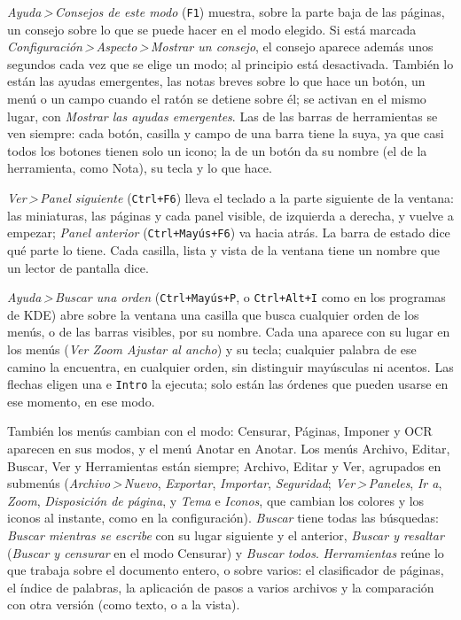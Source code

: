 \documentclass[12pt,
              article,
              oneside
              ]{memoir}
\newcommand*{\menu}[1]{\textit{#1}}
\newcommand*{\then}{\,>\,}
\newcommand*{\key}[1]{\texttt{#1}}
\begin{document}
%
\menu{Ayuda\then Consejos de este modo} (\key{F1}) muestra, sobre la parte
baja de las páginas, un consejo sobre lo que se puede hacer en el modo
elegido. Si está marcada \menu{Configuración\then Aspecto\then Mostrar un
consejo}, el consejo aparece además unos segundos cada vez que se elige un
modo; al principio está desactivada. También lo están las ayudas
emergentes, las notas breves sobre lo que hace un botón, un menú o un campo
cuando el ratón se detiene sobre él; se activan en el mismo lugar, con
\menu{Mostrar las ayudas emergentes}. Las de las barras de herramientas se
ven siempre: cada botón, casilla y campo de una barra tiene la suya, ya que
casi todos los botones tienen solo un icono; la de un botón da su nombre (el
de la herramienta, como Nota), su tecla y lo que hace.

%
\menu{Ver\then Panel siguiente} (\key{Ctrl+F6}) lleva el teclado a la parte
siguiente de la ventana: las miniaturas, las páginas y cada panel visible,
de izquierda a derecha, y vuelve a empezar; \menu{Panel anterior}
(\key{Ctrl+Mayús+F6}) va hacia atrás. La barra de estado dice qué parte lo
tiene. Cada casilla, lista y vista de la ventana tiene un nombre que un
lector de pantalla dice.

%
\menu{Ayuda\then Buscar una orden} (\key{Ctrl+Mayús+P}, o \key{Ctrl+Alt+I}
como en los programas de KDE) abre sobre la ventana una casilla que busca cualquier orden de los
menús, o de las barras visibles, por su nombre. Cada una aparece con su
lugar en los menús (\menu{Ver \textrightarrow{} Zoom \textrightarrow{}
Ajustar al ancho}) y su tecla; cualquier palabra de ese camino la
encuentra, en cualquier orden, sin distinguir mayúsculas ni acentos. Las
flechas eligen una e \key{Intro} la ejecuta; solo están las órdenes que
pueden usarse en ese momento, en ese modo.

%
También los menús cambian con el modo: Censurar, Páginas, Imponer y OCR
aparecen en sus modos, y el menú Anotar en Anotar. Los menús Archivo,
Editar, Buscar, Ver y Herramientas están siempre; Archivo, Editar y Ver,
agrupados en submenús (\menu{Archivo\then Nuevo}, \menu{Exportar},
\menu{Importar}, \menu{Seguridad}; \menu{Ver\then Paneles}, \menu{Ir a},
\menu{Zoom}, \menu{Disposición de página}, y \menu{Tema} e \menu{Iconos}, que
cambian los colores y los iconos al instante, como en la configuración). \menu{Buscar} tiene todas las
búsquedas: \menu{Buscar mientras se escribe} con su lugar siguiente y el
anterior, \menu{Buscar y resaltar} (\menu{Buscar y censurar} en el modo
Censurar) y \menu{Buscar todos}.
\menu{Herramientas} reúne lo que trabaja sobre el documento entero, o sobre
varios: el clasificador de páginas, el índice de palabras, la aplicación de
pasos a varios archivos y la comparación con otra versión (como texto, o a
la vista).
\end{document}

